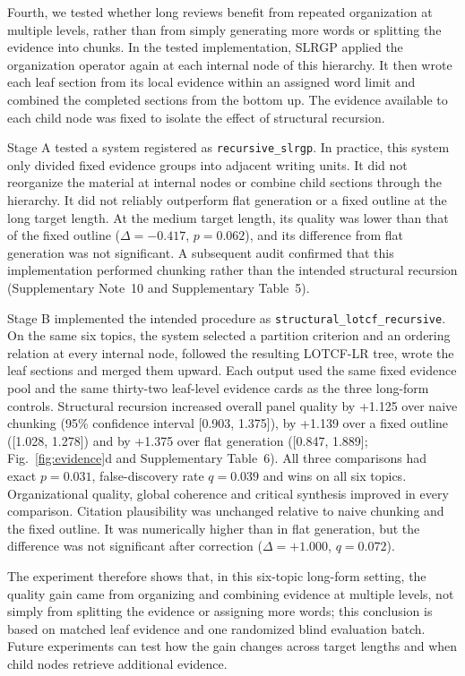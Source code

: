 \documentclass[11pt,a4paper]{article}
\begin{document}
Fourth, we tested whether long reviews benefit from repeated organization at multiple levels, rather than from simply generating more words or splitting the evidence into chunks. In the tested implementation, SLRGP applied the organization operator again at each internal node of this hierarchy. It then wrote each leaf section from its local evidence within an assigned word limit and combined the completed sections from the bottom up. The evidence available to each child node was fixed to isolate the effect of structural recursion.

Stage A tested a system registered as \texttt{recursive\_slrgp}. In practice, this system only divided fixed evidence groups into adjacent writing units. It did not reorganize the material at internal nodes or combine child sections through the hierarchy. It did not reliably outperform flat generation or a fixed outline at the long target length. At the medium target length, its quality was lower than that of the fixed outline ($\Delta=-0.417$, $p=0.062$), and its difference from flat generation was not significant. A subsequent audit confirmed that this implementation performed chunking rather than the intended structural recursion (Supplementary Note~10 and Supplementary Table~5).

Stage B implemented the intended procedure as \texttt{structural\_\allowbreak lotcf\_\allowbreak recursive}. On the same six topics, the system selected a partition criterion and an ordering relation at every internal node, followed the resulting LOTCF-LR tree, wrote the leaf sections and merged them upward. Each output used the same fixed evidence pool and the same thirty-two leaf-level evidence cards as the three long-form controls. Structural recursion increased overall panel quality by +1.125 over naive chunking (95\% confidence interval [0.903, 1.375]), by +1.139 over a fixed outline ([1.028, 1.278]) and by +1.375 over flat generation ([0.847, 1.889]; Fig.~\ref{fig:evidence}d and Supplementary Table~6). All three comparisons had exact $p=0.031$, false-discovery rate $q=0.039$ and wins on all six topics. Organizational quality, global coherence and critical synthesis improved in every comparison. Citation plausibility was unchanged relative to naive chunking and the fixed outline. It was numerically higher than in flat generation, but the difference was not significant after correction ($\Delta=+1.000$, $q=0.072$).

The experiment therefore shows that, in this six-topic long-form setting, the quality gain came from organizing and combining evidence at multiple levels, not simply from splitting the evidence or assigning more words; this conclusion is based on matched leaf evidence and one randomized blind evaluation batch. Future experiments can test how the gain changes across target lengths and when child nodes retrieve additional evidence.
\end{document}
